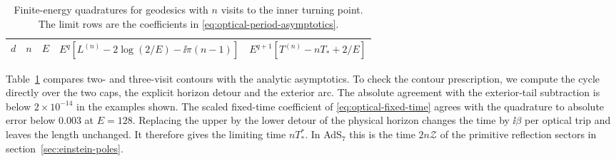 \begin{table}[t]
 \centering\small
 \begin{tabular}{ccccc}
 \hline
 \(d\) & \(n\) & \(E\) &
 \(E^q[L^{(n)}-2\log(2/E)-\ii\pi(n-1)]\) &
 \(E^{q+1}[T^{(n)}-nT_*+2/E]\) \\
 \hline
 
 \end{tabular}
 \caption{Finite-energy quadratures for geodesics with \(n\)
 visits to the inner turning point. The limit rows are the
 coefficients in \eqref{eq:optical-period-asymptotics}.}
 \label{tab:optical-cycles}
\end{table}

Table~\ref{tab:optical-cycles} compares two- and three-visit
contours with the analytic asymptotics. To check the contour
prescription, we compute the cycle directly over the two caps,
the explicit horizon detour and the exterior arc. The absolute
agreement with the exterior-tail subtraction is below
\(2\times10^{-14}\) in the examples shown. The scaled fixed-time
coefficient of \eqref{eq:optical-fixed-time} agrees with the
quadrature to absolute error below \(0.003\) at \(E=128\).
Replacing the upper by
the lower detour of the physical horizon changes the time by
\(\ii\beta\) per optical trip and leaves the length unchanged.
It therefore gives the limiting time \(nT_*^*\). In AdS\(_7\)
this is the time \(2n\mathcal Z\) of the primitive reflection
sectors in section~\ref{sec:einstein-poles}.
